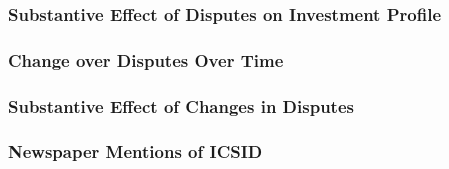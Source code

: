 \documentclass[10pt]{beamer}
\begin{document}
\begin{frame}
\frametitle{Substantive Effect of Disputes on Investment Profile}

\begin{figure}[ht]
	\centering
	\resizebox{1\textwidth}{!}{}	
\end{figure}

\end{frame}

\begin{frame}
\frametitle{Change over Disputes Over Time}

\begin{figure}[ht]
	\centering
	\resizebox{1\textwidth}{!}{}	
\end{figure}

\end{frame}

\begin{frame}
\frametitle{Substantive Effect of Changes in Disputes}

\begin{figure}[ht]
	\centering
	\resizebox{1\textwidth}{!}{}	
\end{figure}

\end{frame}

\begin{frame}
\frametitle{Newspaper Mentions of ICSID}

\begin{figure}[ht]
	\centering
	\resizebox{1\textwidth}{!}{}
\end{figure}

\end{frame}
\end{document}
